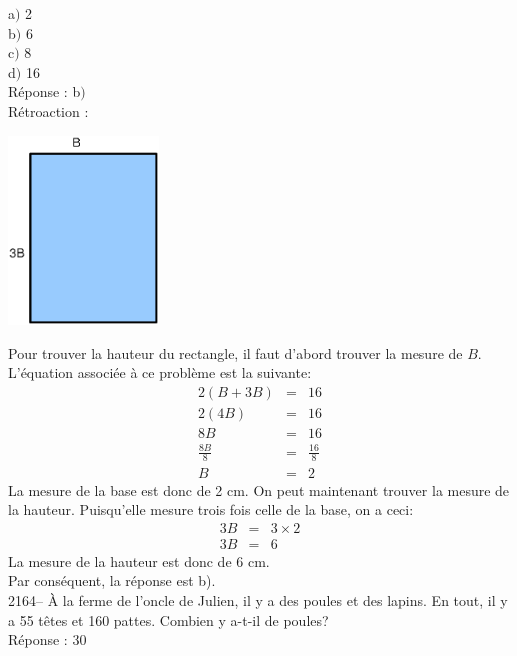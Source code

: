 \documentclass[letterpaper, 12pt]{article}
\begin{document}
a$)$ 2\\
b$)$ 6\\
c$)$ 8\\
d$)$ 16\\

R\'eponse : b$)$\\

R\'etroaction :\\
\begin{center}
 \includegraphics[width=4cm,bb=14 14 297 362]{Q2163.eps}
\end{center}
Pour trouver la hauteur du rectangle, il faut d'abord trouver la mesure de $B$. L'\'equation associ\'ee \`a ce probl\`eme est la suivante:
\begin{eqnarray*}
 2(B+3B)&=&16\\
 2(4B)&=&16\\
 8B&=&16\\[2mm]
\frac{8B}{8}&=&\frac{16}{8}\\[2mm]
B&=&2
\end{eqnarray*}
La mesure de la base est donc de 2 cm. On peut maintenant trouver la mesure de la hauteur. Puisqu'elle mesure trois fois celle de la base, on a ceci:
\begin{eqnarray*}
 3B&=&3\times2\\
3B&=&6
\end{eqnarray*}
La mesure de la hauteur est donc de 6 cm.\\
Par cons\'equent, la r\'eponse est b).\\

2164-- \`A la ferme de l'oncle de Julien, il y a des poules et des lapins. En tout, il y a 55 t\^etes et 160 pattes. Combien y a-t-il de poules?\\

R\'eponse : 30\\
\end{document}
